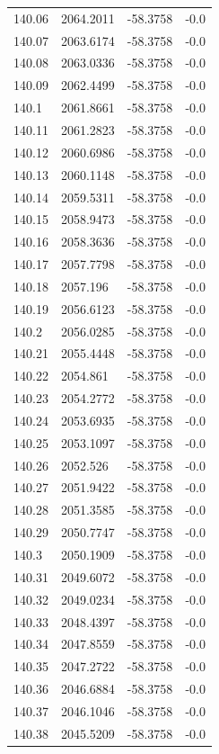 \begin{table}[H]
\begin{tabular}{llll}
140.06 & 2064.2011 & -58.3758 & -0.0 \\
140.07 & 2063.6174 & -58.3758 & -0.0 \\
140.08 & 2063.0336 & -58.3758 & -0.0 \\
140.09 & 2062.4499 & -58.3758 & -0.0 \\
140.1 & 2061.8661 & -58.3758 & -0.0 \\
140.11 & 2061.2823 & -58.3758 & -0.0 \\
140.12 & 2060.6986 & -58.3758 & -0.0 \\
140.13 & 2060.1148 & -58.3758 & -0.0 \\
140.14 & 2059.5311 & -58.3758 & -0.0 \\
140.15 & 2058.9473 & -58.3758 & -0.0 \\
140.16 & 2058.3636 & -58.3758 & -0.0 \\
140.17 & 2057.7798 & -58.3758 & -0.0 \\
140.18 & 2057.196 & -58.3758 & -0.0 \\
140.19 & 2056.6123 & -58.3758 & -0.0 \\
140.2 & 2056.0285 & -58.3758 & -0.0 \\
140.21 & 2055.4448 & -58.3758 & -0.0 \\
140.22 & 2054.861 & -58.3758 & -0.0 \\
140.23 & 2054.2772 & -58.3758 & -0.0 \\
140.24 & 2053.6935 & -58.3758 & -0.0 \\
140.25 & 2053.1097 & -58.3758 & -0.0 \\
140.26 & 2052.526 & -58.3758 & -0.0 \\
140.27 & 2051.9422 & -58.3758 & -0.0 \\
140.28 & 2051.3585 & -58.3758 & -0.0 \\
140.29 & 2050.7747 & -58.3758 & -0.0 \\
140.3 & 2050.1909 & -58.3758 & -0.0 \\
140.31 & 2049.6072 & -58.3758 & -0.0 \\
140.32 & 2049.0234 & -58.3758 & -0.0 \\
140.33 & 2048.4397 & -58.3758 & -0.0 \\
140.34 & 2047.8559 & -58.3758 & -0.0 \\
140.35 & 2047.2722 & -58.3758 & -0.0 \\
140.36 & 2046.6884 & -58.3758 & -0.0 \\
140.37 & 2046.1046 & -58.3758 & -0.0 \\
140.38 & 2045.5209 & -58.3758 & -0.0 \\

\end{tabular}
\end{table}
